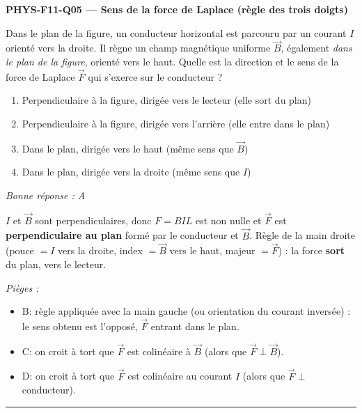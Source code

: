 \documentclass[11pt,a4paper]{article}
\newcommand{\vv}[1]{\vec{#1}}\newcommand{\ds}{\displaystyle}
\begin{document}
\noindent\textbf{PHYS-F11-Q05 --- Sens de la force de Laplace (règle des trois doigts)}\par
Dans le plan de la figure, un conducteur horizontal est parcouru par un courant $I$ orienté vers la droite. Il règne un champ magnétique uniforme $\vv{B}$, également \emph{dans le plan de la figure}, orienté vers le haut. Quelle est la direction et le sens de la force de Laplace $\vv{F}$ qui s'exerce sur le conducteur ?
\begin{center}
\end{center}
\begin{enumerate}[label=\Alph*)]
\item Perpendiculaire à la figure, dirigée vers le lecteur (elle sort du plan)
\item Perpendiculaire à la figure, dirigée vers l'arrière (elle entre dans le plan)
\item Dans le plan, dirigée vers le haut (même sens que $\vv{B}$)
\item Dans le plan, dirigée vers la droite (même sens que $I$)
\end{enumerate}
\textit{Bonne réponse : A}\par
$I$ et $\vv{B}$ sont perpendiculaires, donc $F=BIL$ est non nulle et $\vv{F}$ est \textbf{perpendiculaire au plan} formé par le conducteur et $\vv{B}$. Règle de la main droite (pouce $=I$ vers la droite, index $=\vv{B}$ vers le haut, majeur $=\vv{F}$) : la force \textbf{sort} du plan, vers le lecteur.\par
\textit{Pièges :}
\begin{itemize}
\item B: règle appliquée avec la main gauche (ou orientation du courant inversée) : le sens obtenu est l'opposé, $\vv{F}$ entrant dans le plan.
\item C: on croit à tort que $\vv{F}$ est colinéaire à $\vv{B}$ (alors que $\vv{F}\perp\vv{B}$).
\item D: on croit à tort que $\vv{F}$ est colinéaire au courant $I$ (alors que $\vv{F}\perp$ conducteur).
\end{itemize}
\vspace{8pt}\hrule\vspace{8pt}
\end{document}
